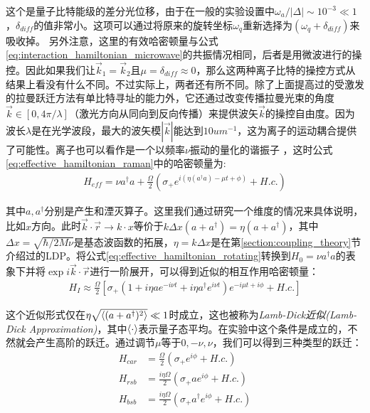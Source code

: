 这个是量子比特能级的差分光位移，由于在一般的实验设置中$\omega_a/|\Delta|\sim 10^{-3}\ll 1$，$\delta_{diff}$的值非常小。这项可以通过将原来的旋转坐标$\omega_q$重新选择为$(\omega_q+\delta_{diff})$来吸收掉。
另外注意，这里的有效哈密顿量与公式\eqref{eq:interaction_hamiltonian_microwave}的共振情况相同，后者是用微波进行的操控。因此如果我们让$\vec{k}_1=\vec{k}_2$且$\mu=\delta_{diff}\approx0$，那么这两种离子比特的操控方式从结果上看没有什么不同。不过实际上，两者还有所不同。除了上面提高过的受激发的拉曼跃迁方法有单比特寻址的能力外，它还通过改变传播拉曼光束的角度$\vec{k}\in[0,4\pi/\lambda]$（激光方向从同向到反向传播）来提供波矢$\vec{k}$的操控自由度。因为波长$\lambda$是在光学波段，最大的波矢模$|\vec{k}|$能达到$10um^{-1}$，这为离子的运动耦合提供了可能性。离子也可以看作是一个以频率$\nu$振动的量化的谐振子
，这时公式\eqref{eq:effective_hamiltonian_raman}中的哈密顿量为:
\begin{align}
    H_{eff}=\nu a^\dagger a+\frac{\Omega}{2}\left(\sigma_+e^{i(\eta(a^\dagger a)-\mu t+\phi)}+H.c.\right) \label{eq:effective_hamiltonian_rotating}
\end{align}

其中$a,a^\dagger$分别是产生和湮灭算子。这里我们通过研究一个维度的情况来具体说明，比如$x$方向。此时$\vec{k}\cdot\vec{r}\to k\cdot x$等价于$k\Delta x(a+a^\dagger)=\eta(a+a^\dagger)$，其中$\Delta x=\sqrt{\hbar/2M\nu}$是基态波函数的拓展，$\eta=k\Delta x$是在第\ref{section:coupling_theory}节介绍过的LDP。将公式\eqref{eq:effective_hamiltonian_rotating}转换到$H_0=\nu a^\dagger a$的表象下并将$\exp{i\vec{k}\cdot \vec{r}}$进行一阶展开，可以得到近似的相互作用哈密顿量：
\begin{align}
    H_I\approx\frac{\Omega}{2}\left[\sigma_+(1+i\eta a e^{-i\nu t}+i\eta a^\dagger e^{i\nu t})e^{-i\mu t+i\phi}+H.c.\right]
\end{align}

这个近似形式仅在$\eta\sqrt{\braket{(a+a^\dagger)^2}}\ll1$时成立，这也被称为\emph{Lamb-Dick近似(Lamb-Dick Approximation)}，其中$\braket{\cdot}$表示量子态平均。在实验中这个条件是成立的，不然就会产生高阶的跃迁。通过调节$\mu$等于$0,-\nu,\nu$，我们可以得到三种类型的跃迁：
\begin{align}
    H_{car}&=\frac{\Omega}{2}(\sigma_+e^{i\phi}+H.c.)\\
    H_{rsb}&=\frac{i\eta\Omega}{2}(\sigma_+ae^{i\phi}+H.c.)\\
    H_{bsb}&=\frac{i\eta\Omega}{2}(\sigma_+a^\dagger e^{i\phi}+H.c.)
\end{align}

